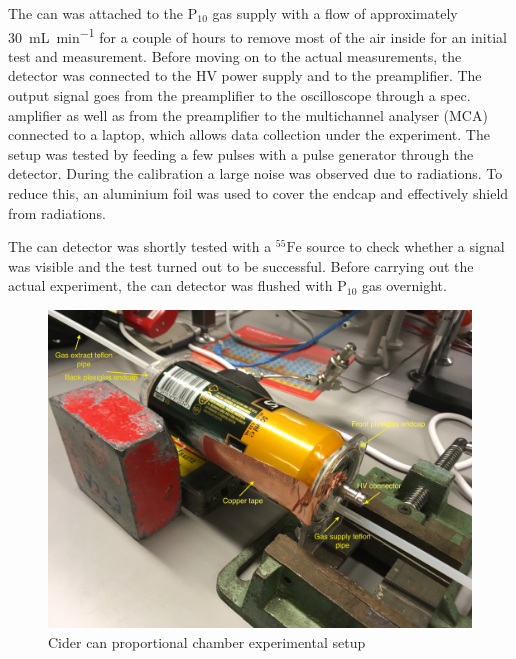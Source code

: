The can was attached to the $\mathrm{P}_{10}$ gas supply with a flow of
approximately \SI{30}{\milli\liter\per\minute} for a couple of hours to remove
most of the air inside for an initial test and measurement. Before moving on to
the actual measurements, the detector was connected to the HV power supply and
to the preamplifier. The output signal goes from the preamplifier to the
oscilloscope through a spec. amplifier as well as from the preamplifier to the
multichannel analyser (MCA) connected to a laptop, which allows data collection
under the experiment. The setup was tested by feeding a few pulses with a pulse
generator through the detector. During the calibration a large noise was
observed due to radiations. To reduce this, an aluminium foil was used to cover
the endcap and effectively shield from radiations.


The can detector was shortly tested with a $^{55}\mathrm{Fe}$ source to check
whether a signal was visible and the test turned out to be successful. Before
carrying out the actual experiment, the can detector was flushed with
$\mathrm{P}_{10}$ gas overnight.

\begin{figure}[htb]
	\centering
	\includegraphics[width=\textwidth]{./graphics/beercansetup}
	\caption{Cider can proportional chamber experimental setup}
	\label{fig:BeerCan}
\end{figure}

